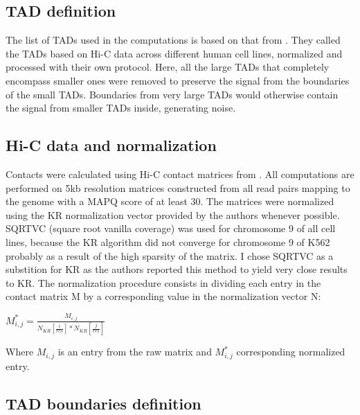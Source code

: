 \documentclass[11pt,a4paper]{report}
\begin{document}
\subsection*{TAD definition}

The list of TADs used in the computations is based on that from \cite{Rao2014}. They called the TADs based on Hi-C data across different human cell lines, normalized and processed with their own protocol. Here, all the large TADs that completely encompass smaller ones were removed to preserve the signal from the boundaries of the small TADs. Boundaries from very large TADs would otherwise contain the signal from smaller TADs inside, generating noise.

\subsection*{Hi-C data and normalization}

Contacts were calculated using Hi-C contact matrices from \cite{Rao2014}. All computations are performed on 5kb resolution matrices constructed from all read pairs mapping to the genome with a MAPQ score of at least 30. The matrices were normalized using the KR normalization vector provided by the authors whenever possible. SQRTVC (square root vanilla coverage) was used for chromosome 9 of all cell lines, because the KR algorithm did not converge for chromosome 9 of K562 probably as a result of the high sparsity of the matrix. I chose SQRTVC as a substition for KR as the authors reported this method  to yield very close results to KR. 
The normalization procedure consists in dividing each entry in the contact matrix M by a corresponding value in the normalization vector N:

\vspace{0.2in}
$M^*_{i,j}=\frac{M_{i,j}}{N_{KR}[\frac{i}{res}]*N_{KR}[\frac{j}{res}]}$
\vspace{0.2in}

\noindent Where $M_{i,j}$ is an entry from the raw matrix and $M^*_{i,j}$ corresponding normalized entry.

\subsection*{TAD boundaries definition}
\end{document}
